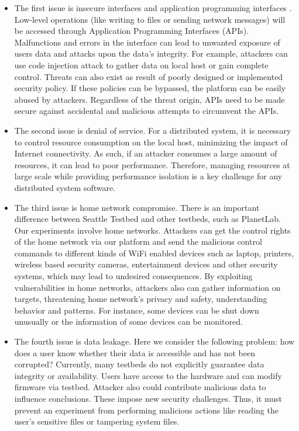 \begin{itemize}
\item The first issue is insecure interfaces and application programming interfaces
. Low-level operations (like writing to files or sending network messages) 
will be accessed through Application Programming Interfaces (APIs). 
Malfunctions and errors in the interface can lead to unwanted exposure of 
users data and attacks upon the data's integrity. For example, attackers can 
use code injection attack to gather data on local host or gain complete 
control. Threats can also exist as result of poorly designed or implemented 
security policy. If these policies can be bypassed, the platform can be 
easily abused by attackers. Regardless of the threat origin, APIs need to be 
made secure against accidental and malicious attempts to circumvent the APIs.

\item The second issue is denial of service. For a distributed system, it is 
necessary to control resource consumption on the local host, minimizing the 
impact of Internet connectivity. As such, if an attacker consumes a large 
amount of resources, it can lead to poor performance. Therefore, managing 
resources at large scale while providing performance isolation is a key 
challenge for any distributed system software.

\item The third issue is home network compromise. There is an important difference between Seattle Testbed and other testbeds, such as PlanetLab. Our experiments involve home networks. Attackers can get the control rights of the home network via our platform and send the malicious control commands to different kinds of WiFi enabled devices such as laptop, printers, wireless based security cameras, entertainment devices and other security systems, which may lead to undesired consequences. By exploiting vulnerabilities in home networks, attackers also can gather information on targets, threatening home network's privacy and safety, understanding behavior and patterns. For instance, some devices can be shut down unusually or the information of some devices can be monitored.

\item The fourth issue is data leakage. Here we consider the following problem: how does a user know whether their data is accessible and has not been corrupted? Currently, many testbeds do not explicitly guarantee data integrity or availability. Users have access to the hardware and can modify firmware via testbed. Attacker also could contribute malicious data to influence conclusions. These impose new security challenges. Thus, it must prevent an experiment from performing malicious actions like reading the user's sensitive files or tampering system files.
\end{itemize}